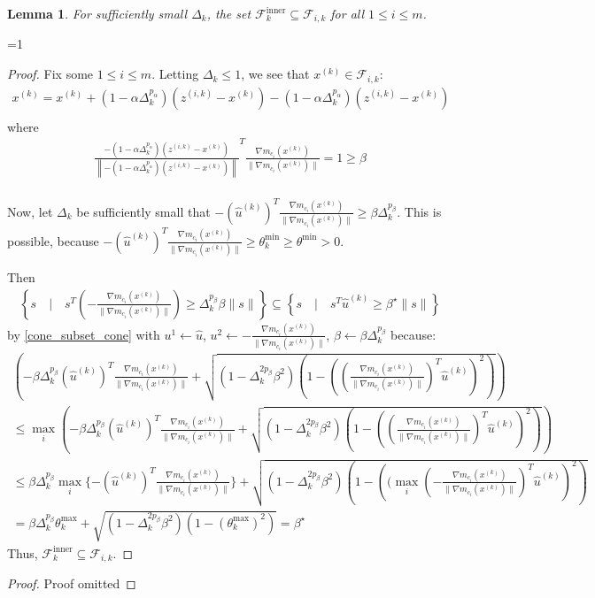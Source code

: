 \documentclass{article}
\newtheorem{lemma}[theorem]{Lemma}
\theoremstyle{case}
\newcommand{\xk}{{x^{(k)}}}
\newcommand{\dk}{\Delta_k}
\newcommand{\zik}{{z^{(i, k)}}}
\newcommand{\fik}{{\mathcal F_{i, k}}}
\newcommand{\huk}{{{\hat u}^{(k)}}}
\newcommand{\fcki}{{\mathcal {F}^{\text{inner}}_k}}
\newcommand{\gmcik}{{\nabla m_{c_i}(\xk)}}
\newcommand{\hgik}{{\frac{\nabla m_{c_i}(\xk)}{\|\nabla m_{c_i}(\xk)\|}}}
\def\includeproofs{1}
\begin{document}
\begin{lemma}
For sufficiently small $\dk$, the set $\fcki \subseteq \fik$ for all $1\le i \le m$.
\end{lemma}


\ifnum\includeproofs=1
\begin{proof}
Fix some $1\le i \le m$.
Letting $\dk \le 1$, we see that $\xk \in \fik$:
\begin{align*}
\xk = \xk + \left(1 - \alpha\dk^{p_{\alpha} }\right)(\zik - \xk) - \left(1 - \alpha\dk^{p_{\alpha} }\right)(\zik - \xk) \\
\end{align*}
where
\begin{align*}
\frac{-\left(1 - \alpha\dk^{p_{\alpha} }\right)(\zik - \xk)}{\left\|-\left(1 - \alpha\dk^{p_{\alpha} }\right)(\zik - \xk)\right\|}^T\hgik = 1 \ge \beta\\
\end{align*}


Now, let $\dk$ be sufficiently small that $-(\huk)^T\hgik \ge \beta\dk^{p_{\beta}}$.
This is possible, because $ -(\huk)^T\hgik \ge \theta^{\text{min}}_k \ge \theta^{\text{min}} > 0$.

Then
\begin{align*}
\left\{s\quad | \quad s^T(-\hgik)\ge\dk^{p_{\beta}}\beta\|s\| \right\}  \subseteq \left\{s\quad | \quad s^T\huk\ge\beta^{\star}\|s\| \right\}
\end{align*}
by \cref{cone_subset_cone} with $u^1 \gets \hat u$, $u^2 \gets -\hgik$, $\beta \gets \beta \dk^{p_{\beta}}$ because:
\begin{align*}
\left(-\beta\dk^{p_{\beta}}(\huk)^T\hgik + \sqrt{(1 - \dk^{2p_{\beta}}\beta^2)\left(1 - \left((\hgik)^T\hat u^{(k)}\right)^2\right)}\right) \\
\le \max_i \left(-\beta\dk^{p_{\beta}}(\huk)^T{\hgik} + \sqrt{(1 - \dk^{2p_{\beta}}\beta^2)\left(1 - \left((\hgik)^T\huk\right)^2\right)}\right) \\
\le \beta\dk^{p_{\beta}} \max_i\{-(\huk)^T\hgik\} + \sqrt{(1 - \dk^{2p_{\beta}}\beta^2)\left(1 - \left((\max_i(-\hgik)^T\huk\right)^2\right)} \\
= \beta\dk^{p_{\beta}} \theta^{\text{max}}_k + \sqrt{(1 - \dk^{2p_{\beta}}\beta^2)\left(1 - (\theta^{\text{max}}_k) ^2\right)} = \beta^{\star}
\end{align*}
Thus, $\fcki \subseteq \fik$.
\end{proof}
\else
\begin{proof}
Proof omitted
\end{proof}
\fi
\end{document}
